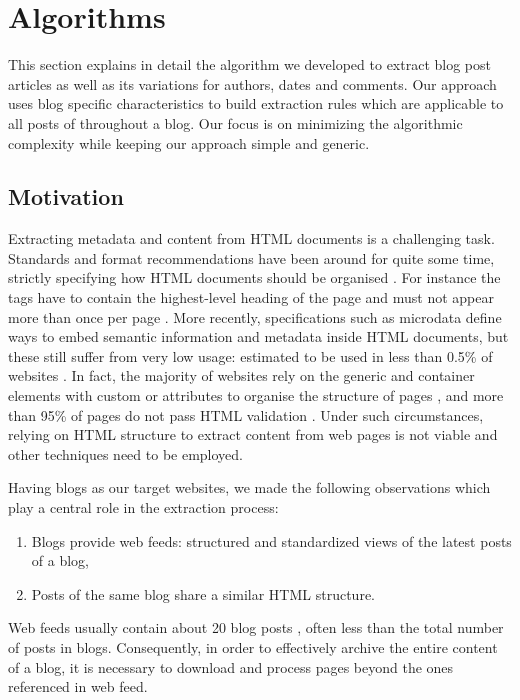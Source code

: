\section{Algorithms}
\label{algorithms}

This section explains in detail the algorithm we developed to extract blog post articles as well as its variations for authors, dates and comments. Our approach uses blog specific characteristics to build extraction rules which are applicable to all posts of throughout a blog. Our focus is on minimizing the algorithmic complexity while keeping our approach simple and generic.


\subsection{Motivation}
\label{motivation}

Extracting metadata and content from HTML documents is a challenging task. Standards and format recommendations have been around for quite some time, strictly specifying how HTML documents should be organised \cite{w3c2014}. For instance the  tags have to contain the highest-level heading of the page and must not appear more than once per page \cite{w3c2002}. More recently, specifications such as microdata \cite{whatwg2014} define ways to embed semantic information and metadata inside HTML documents, but these still suffer from very low usage: estimated to be used in less than 0.5\% of websites \cite{andrewrogers2014}. In fact, the majority of websites rely on the generic  and  container elements with custom  or  attributes to organise the structure of pages \cite{brianwilson2008}, and more than 95\% of pages do not pass HTML validation \cite{brianwilson2008-a}. Under such circumstances, relying on HTML structure to extract content from web pages is not viable and other techniques need to be employed.


Having blogs as our target websites, we made the following observations which play a central role in the extraction process:
\begin{enumerate}[label={(\arabic*)}]
  \item\label{havefeedAssum} Blogs provide web feeds: structured and standardized views of the latest posts of a blog,
  \item\label{similarhtmlAssum} Posts of the same blog share a similar HTML structure.
\end{enumerate}
Web feeds usually contain about 20 blog posts \cite{oita2010}, often less than the total number of posts in blogs. Consequently, in order to effectively archive the entire content of a blog, it is necessary to download and process pages beyond the ones referenced in web feed.


